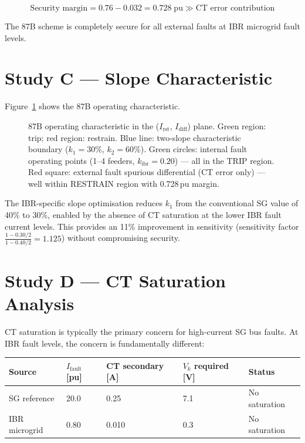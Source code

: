 \documentclass[11pt,a4paper]{article}
\begin{document}
\begin{equation}
  \text{Security margin} = 0.76 - 0.032 = 0.728\;\mathrm{pu}
  \gg \text{CT error contribution}
\end{equation}

The 87B scheme is completely secure for all external faults at IBR microgrid
fault levels.

\section{Study C --- Slope Characteristic}
\label{sec:studyC}

Figure~\ref{fig:characteristic} shows the 87B operating characteristic.

\begin{figure}[htbp]
  \centering
  \resizebox{0.88\textwidth}{!}{}
  \caption{87B operating characteristic in the ($I_\mathrm{rst}$,
           $I_\mathrm{diff}$) plane.  Green region: trip; red region:
           restrain.  Blue line: two-slope characteristic boundary
           ($k_1=30\%$, $k_2=60\%$).  Green circles: internal fault
           operating points (1--4 feeders, $k_\mathrm{ibr}=0.20$) --- all in
           the TRIP region.  Red square: external fault spurious differential
           (CT error only) --- well within RESTRAIN region with 0.728\,pu margin.}
  \label{fig:characteristic}
\end{figure}

\noindent
The IBR-specific slope optimisation reduces $k_1$ from the conventional SG
value of 40\% to 30\%, enabled by the absence of CT saturation at the lower
IBR fault current levels.  This provides an 11\% improvement in sensitivity
(sensitivity factor $\frac{1-0.30/2}{1-0.40/2}=1.125$) without compromising
security.

\section{Study D --- CT Saturation Analysis}
\label{sec:studyD}

CT saturation is typically the primary concern for high-current SG bus faults.
At IBR fault levels, the concern is fundamentally different:

\begin{center}
\begin{tabular}{@{}lllll@{}}
\toprule
Source & $I_\mathrm{fault}$ [pu] & CT secondary [A] & $V_k$ required [V] & Status \\
\midrule
SG reference & 20.0 & 0.25 & 7.1 & No saturation \\
IBR microgrid & 0.80 & 0.010 & 0.3 & No saturation \\
\bottomrule
\end{tabular}
\end{center}
\end{document}
